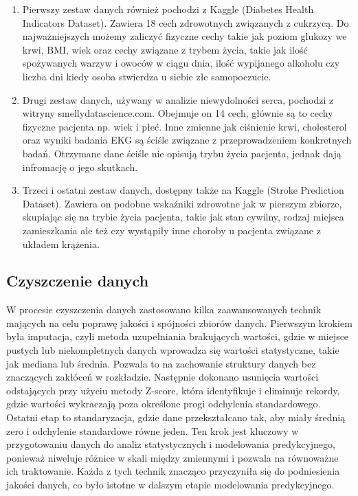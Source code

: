 \documentclass[onecolumn,12pt]{article}
\begin{document}
\begin{enumerate}
  \item Pierwszy zestaw danych również pochodzi z Kaggle (Diabetes Health Indicators Dataset). Zawiera 18 cech zdrowotnych związanych z cukrzycą. Do najważniejszych możemy zaliczyć fizyczne cechy takie jak poziom glukozy we krwi, BMI, wiek oraz cechy związane z trybem życia, takie jak ilość spożywanych warzyw i owoców w ciągu dnia, ilość wypijanego alkoholu czy liczba dni kiedy osoba stwierdza u siebie złe samopoczucie. 
  
  \item Drugi zestaw danych, używany w analizie niewydolności serca, pochodzi z witryny smellydatascience.com. Obejmuje on 14 cech,  głównie są to cechy fizyczne pacjenta np. wiek i płeć. Inne zmienne jak ciśnienie krwi, cholesterol oraz wyniki badania EKG są ściśle związane z przeprowadzeniem konkretnych badań. Otrzymane dane ściśle nie opisują trybu życia pacjenta, jednak dają infromację o jego skutkach.
  
  \item Trzeci i ostatni zestaw danych, dostępny także na Kaggle (Stroke Prediction Dataset). Zawiera on podobne wskaźniki zdrowotne jak w pierszym zbiorze, skupiając się na trybie życia pacjenta, takie jak stan cywilny, rodzaj miejsca zamieszkania ale też czy wystąpiły inne choroby u pacjenta związane z układem krążenia. 
\end{enumerate}

\subsection{Czyszczenie danych}
\noindent
W procesie czyszczenia danych zastosowano kilka zaawansowanych technik mających na celu poprawę jakości i spójności zbiorów danych. Pierwszym krokiem była imputacja, czyli metoda uzupełniania brakujących wartości, gdzie w miejsce pustych lub niekompletnych danych wprowadza się wartości statystyczne, takie jak mediana lub średnia. Pozwala to na zachowanie struktury danych bez znaczących zakłóceń w rozkładzie. Następnie dokonano usunięcia wartości odstających  przy użyciu metody Z-score, która identyfikuje i eliminuje rekordy, gdzie wartości wykraczają poza określone progi odchylenia standardowego. Ostatni etap to standaryzacja, gdzie dane przekształcano tak, aby miały średnią zero i odchylenie standardowe równe jeden. Ten krok jest kluczowy w przygotowaniu danych do analiz statystycznych i modelowania predykcyjnego, ponieważ niweluje różnice w skali między zmiennymi i pozwala na równoważne ich traktowanie. Każda z tych technik znacząco przyczyniła się do podniesienia jakości danych, co było istotne w dalszym etapie modelowania predykcyjnego.
\end{document}
